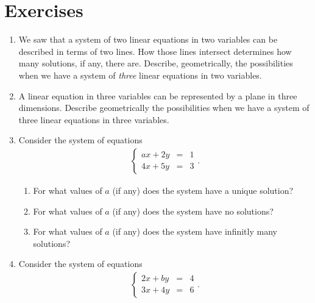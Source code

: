 \documentclass[
]{book}
\providecommand{\tightlist}{%
  \setlength{\itemsep}{0pt}\setlength{\parskip}{0pt}}
\theoremstyle{definition}
\theoremstyle{definition}
\theoremstyle{definition}
\theoremstyle{definition}
\theoremstyle{remark}
\begin{document}
\pagebreak

\section{Exercises}\label{exercises}

\begin{enumerate}
\def\labelenumi{\arabic{enumi}.}
\item
  We saw that a system of two linear equations in two variables can be described in terms of two lines. How those lines intersect determines how many solutions, if any, there are. Describe, geometrically, the possibilities when we have a system of \emph{three} linear equations in two variables.
\item
  A linear equation in three variables can be represented by a plane in three dimensions. Describe geometrically the possibilities when we have a system of three linear equations in three variables.
\item
  Consider the system of equations
  \begin{align*}
  \left\{\begin{array}{rrr}
  ax+2y&=&1\\
  4x+5y&=&3
  \end{array}\right. .
  \end{align*}

  \begin{enumerate}
  \def\labelenumii{\alph{enumii}.}
  \tightlist
  \item
    For what values of \(a\) (if any) does the system have a unique solution?
  \item
    For what values of \(a\) (if any) does the system have no solutions?
  \item
    For what values of \(a\) (if any) does the system have infinitly many solutions?
  \end{enumerate}
\item
  Consider the system of equations
  \begin{align*}
  \left\{\begin{array}{rrr}
  2x+by&=&4\\
  3x+4y&=&6
  \end{array}\right. .
  \end{align*}


\end{enumerate}
\end{document}

